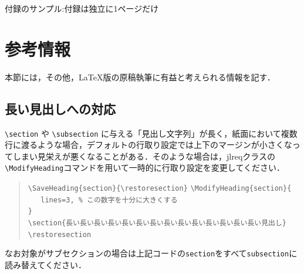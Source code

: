 \documentclass[
  platex, dvipdfmx,  %
]{nlp2026}
\newcommand{\code}[1]{\texttt{#1}}
\begin{document}




\clearpage
\appendix
{付録のサンプル:付録は独立に1ページだけ}
\section{参考情報}
本節には，その他，LaTeX版の原稿執筆に有益と考えられる情報を記す．


\subsection{長い見出しへの対応}
\verb|\section|
や
\verb|\subsection|
に与える「見出し文字列」が長く，紙面において複数行に渡るような場合，デフォルトの行取り設定では上下のマージンが小さくなってしまい見栄えが悪くなることがある．そのような場合は，jlreqクラスの \verb|\ModifyHeading|コマンドを用いて一時的に行取り設定を変更してください．

\begin{quote}
\verb|\SaveHeading{section}{\restoresection}|
\verb|\ModifyHeading{section}{|\\
\verb|   lines=3, % この数字を十分に大きくする|\\
\verb|}|\\
\verb|\section{長い長い長い長い長い長い長い長い長い長い長い長い長い長い見出し}|\\
\verb|\restoresection|
\end{quote}

なお対象がサブセクションの場合は上記コードの\code{section}をすべて\code{subsection}に読み替えてください．
\end{document}
